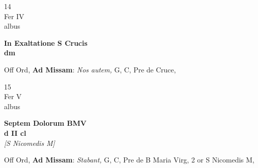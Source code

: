 \documentclass[10pt, openany]{book}
\begin{document}
        \begin{center}
            \begin{minipage}{3.5in}
                \vspace{2em}
                \begin{minipage}{0.5in}
                    {\Huge 14} \\
                    {\normalsize Fer IV} \\
                    {\normalsize albus}
                \end{minipage}
                \begin{minipage}{3.0in}
                    \textbf{ \large In Exaltatione S Crucis \\
                    \textnormal{\normalsize dm}} \\ 
                \end{minipage}
                \begin{justify}Off Ord, \textbf{Ad Missam}: \textit{Nos autem,} G, C, Pre de Cruce,  
                \end{justify}
            \end{minipage}
        \end{center}
    
        \begin{center}
            \begin{minipage}{3.5in}
                \vspace{2em}
                \begin{minipage}{0.5in}
                    {\Huge 15} \\
                    {\normalsize Fer V} \\
                    {\normalsize albus}
                \end{minipage}
                \begin{minipage}{3.0in}
                    \textbf{ \large Septem Dolorum BMV \\
                    \textnormal{\normalsize d II cl}} \\ \textit{[S Nicomedis M]} \\ 
                \end{minipage}
                \begin{justify}Off Ord, \textbf{Ad Missam}: \textit{Stabant,} G, C, Pre de B Maria Virg, 2 or S Nicomedis M,  
                \end{justify}
            \end{minipage}
        \end{center}
    
\end{document}
